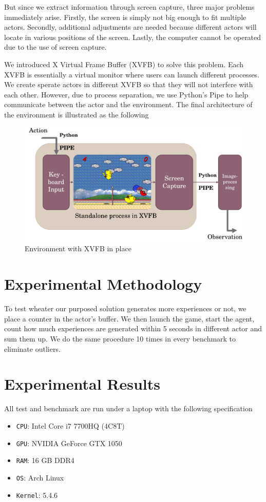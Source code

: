 \documentclass[sigconf]{acmart}
\begin{document}
But since we extract information through screen capture, three major problems immediately arise. Firstly, the screen is simply not big enough to fit multiple actors. Secondly, additional adjustments are needed because different actors will locate in various positions of the screen. Lastly, the computer cannot be operated due to the use of screen capture.

We introduced X Virtual Frame Buffer (XVFB) to solve this problem. Each XVFB is essentially a virtual monitor where users can launch different processes. We create sperate actors in different XVFB so that they will not interfere with each other. However, due to process separation, we use Python's Pipe to help communicate between the actor and the environment. The final architecture of the environment is illustrated as the following
\begin{figure}[h]
  \centering
  \includegraphics[width=\columnwidth]{xvfb.png}
  \caption{Environment with XVFB in place}
\end{figure}

\section{Experimental Methodology}
To test wheater our purposed solution generates more experiences or not, we place a counter in the actor's buffer. We then launch the game, start the agent, count how much experiences are generated within 5 seconds in different actor and sum them up. We do the same procedure 10 times in every benchmark to eliminate outliers.

\section{Experimental Results}
All test and benchmark are run under a laptop with the following specification
\begin{itemize}
\item {\verb|CPU|}: Intel Core i7 7700HQ (4C8T)
\item {\verb|GPU|}: NVIDIA GeForce GTX 1050
\item {\verb|RAM|}: 16 GB DDR4
\item {\verb|OS|}: Arch Linux
\item {\verb|Kernel|}: 5.4.6
\end{itemize}
\end{document}
